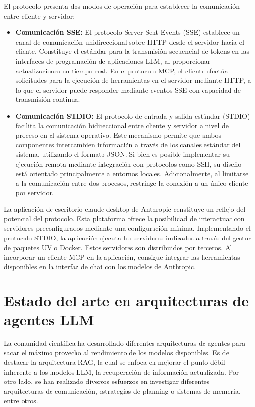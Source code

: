 El protocolo presenta dos modos de operación para establecer la comunicación entre cliente y servidor:
\begin{itemize}
\item{\textbf{Comunicación SSE: } El protocolo Server-Sent Events (SSE) establece un canal de comunicación unidireccional sobre HTTP desde el servidor hacia el cliente. Constituye el estándar para la transmisión secuencial de tokens en las interfaces de programación de aplicaciones LLM, al proporcionar actualizaciones en tiempo real. En el protocolo MCP, el cliente efectúa solicitudes para la ejecución de herramientas en el servidor mediante HTTP, a lo que el servidor puede responder mediante eventos SSE con capacidad de transmisión continua.}
\item{\textbf{Comunicación STDIO: } El protocolo de entrada y salida estándar (STDIO) facilita la comunicación bidireccional entre cliente y servidor a nivel de proceso en el sistema operativo. Este mecanismo permite que ambos componentes intercambien información a través de los canales estándar del sistema, utilizando el formato JSON. Si bien es posible implementar su ejecución remota mediante integración con protocolos como SSH, su diseño está orientado principalmente a entornos locales. Adicionalmente, al limitarse a la comunicación entre dos procesos, restringe la conexión a un único cliente por servidor.}
\end{itemize}
La aplicación de escritorio claude-desktop de Anthropic constituye un reflejo del potencial del protocolo. Esta plataforma ofrece la posibilidad de interactuar con servidores preconfigurados mediante una configuración mínima. Implementando el protocolo STDIO, la aplicación ejecuta los servidores indicados a través del gestor de paquetes UV o Docker. Estos servidores son distribuidos por terceros. Al incorporar un cliente MCP en la aplicación, consigue integrar las herramientas disponibles en la interfaz de chat con los modelos de Anthropic.

\section{Estado del arte en arquitecturas de agentes LLM}

La comunidad científica ha desarrollado diferentes arquitecturas de agentes para sacar el máximo provecho al rendimiento de los modelos disponibles. Es de destacar la arquitectura RAG, la cual se enfoca en mejorar el punto débil inherente a los modelos LLM, la recuperación de información actualizada. Por otro lado, se han realizado diversos esfuerzos en investigar diferentes arquitecturas de comunicación, estrategias de planning o sistemas de memoria, entre otros.

